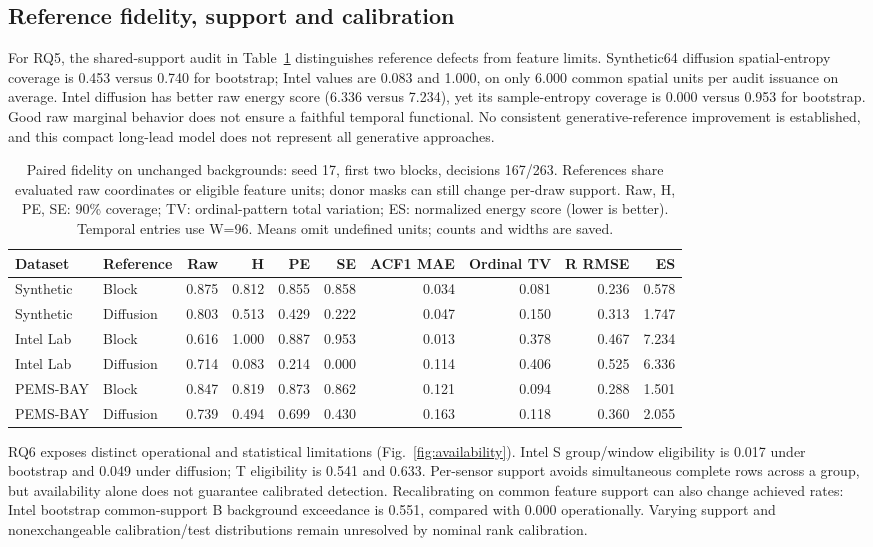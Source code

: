 \subsection{Reference fidelity, support and calibration}
For RQ5, the shared-support audit in Table~\ref{tab:fidelity} distinguishes
reference defects from feature limits. Synthetic64 diffusion spatial-entropy
coverage is 0.453
versus 0.740 for bootstrap;
Intel values are 0.083 and
1.000, on only
6.000 common spatial units per audit issuance on average.
Intel diffusion has better raw energy score
(6.336 versus 7.234),
yet its sample-entropy coverage is 0.000
versus 0.953 for bootstrap.
Good raw marginal behavior does not ensure a faithful temporal functional.
No consistent generative-reference improvement is established, and this compact
long-lead model does not represent all generative approaches.
\begin{table}[t]\centering\small
\caption{Paired fidelity on unchanged backgrounds: seed 17, first two blocks, decisions 167/263. References share evaluated raw coordinates or eligible feature units; donor masks can still change per-draw support. Raw, H, PE, SE: 90\% coverage; TV: ordinal-pattern total variation; ES: normalized energy score (lower is better). Temporal entries use W=96. Means omit undefined units; counts and widths are saved.}\label{tab:fidelity}
\begin{tabular}{llrrrrrrrr}\toprule Dataset&Reference&Raw&H&PE&SE&ACF1 MAE&Ordinal TV&R RMSE&ES\\\midrule
Synthetic & Block & 0.875 & 0.812 & 0.855 & 0.858 & 0.034 & 0.081 & 0.236 & 0.578 \\
Synthetic & Diffusion & 0.803 & 0.513 & 0.429 & 0.222 & 0.047 & 0.150 & 0.313 & 1.747 \\
Intel Lab & Block & 0.616 & 1.000 & 0.887 & 0.953 & 0.013 & 0.378 & 0.467 & 7.234 \\
Intel Lab & Diffusion & 0.714 & 0.083 & 0.214 & 0.000 & 0.114 & 0.406 & 0.525 & 6.336 \\
PEMS-BAY & Block & 0.847 & 0.819 & 0.873 & 0.862 & 0.121 & 0.094 & 0.288 & 1.501 \\
PEMS-BAY & Diffusion & 0.739 & 0.494 & 0.699 & 0.430 & 0.163 & 0.118 & 0.360 & 2.055 \\
\bottomrule\end{tabular}\end{table}

RQ6 exposes distinct operational and statistical limitations (Fig.~\ref{fig:availability}).
Intel S group/window eligibility is 0.017 under bootstrap
and 0.049 under diffusion; T eligibility is
0.541 and 0.633.
Per-sensor support avoids simultaneous complete rows across a group, but
availability alone does not guarantee calibrated detection. Recalibrating
on common feature support can also change achieved rates: Intel bootstrap
common-support B background exceedance is 0.551,
compared with 0.000 operationally. Varying support and nonexchangeable
calibration/test distributions remain unresolved by nominal rank calibration.

